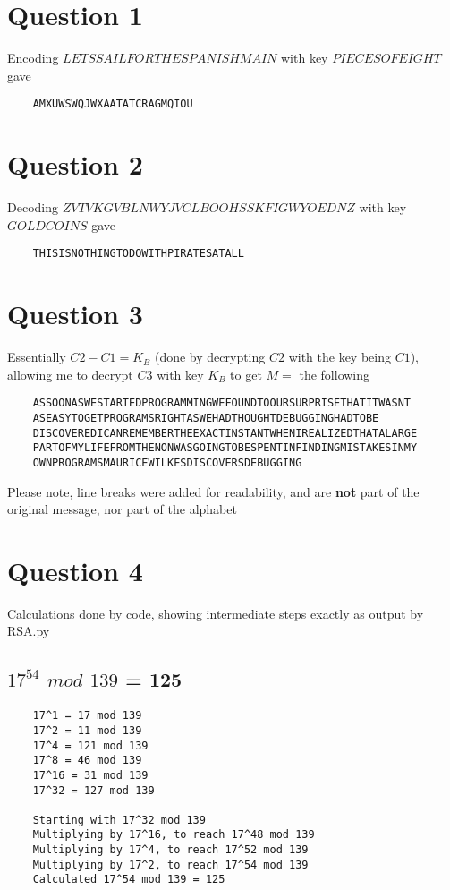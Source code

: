 \documentclass[a4paper,12pt]{article}
\begin{document}
\section*{Question 1}
Encoding $LETSSAILFORTHESPANISHMAIN$ with key $PIECESOFEIGHT$ gave \\
\begin{verbatim}
    AMXUWSWQJWXAATATCRAGMQIOU
\end{verbatim}

\section*{Question 2}
Decoding $ZVTVKGVBLNWYJVCLBOOHSSKFIGWYOEDNZ$ with key $GOLDCOINS$ gave \\
\begin{verbatim}
    THISISNOTHINGTODOWITHPIRATESATALL
\end{verbatim}

\section*{Question 3}
Essentially $C2 - C1 = K_B$ (done by decrypting $C2$ with the key being $C1$), allowing me to decrypt $C3$ with key $K_B$ to get $M =$ the following
\begin{verbatim}
    ASSOONASWESTARTEDPROGRAMMINGWEFOUNDTOOURSURPRISETHATITWASNT
    ASEASYTOGETPROGRAMSRIGHTASWEHADTHOUGHTDEBUGGINGHADTOBE
    DISCOVEREDICANREMEMBERTHEEXACTINSTANTWHENIREALIZEDTHATALARGE
    PARTOFMYLIFEFROMTHENONWASGOINGTOBESPENTINFINDINGMISTAKESINMY
    OWNPROGRAMSMAURICEWILKESDISCOVERSDEBUGGING
\end{verbatim}
Please note, line breaks were added for readability, and are \textbf{not} part of the original message, nor part of the alphabet

\section*{Question 4}
Calculations done by code, showing intermediate steps exactly as output by RSA.py
\subsection*{$17^{54}$ $mod$ $139$ = 125}
\begin{verbatim}
    17^1 = 17 mod 139
    17^2 = 11 mod 139
    17^4 = 121 mod 139
    17^8 = 46 mod 139
    17^16 = 31 mod 139
    17^32 = 127 mod 139

    Starting with 17^32 mod 139
    Multiplying by 17^16, to reach 17^48 mod 139
    Multiplying by 17^4, to reach 17^52 mod 139
    Multiplying by 17^2, to reach 17^54 mod 139
    Calculated 17^54 mod 139 = 125
\end{verbatim}
\end{document}
